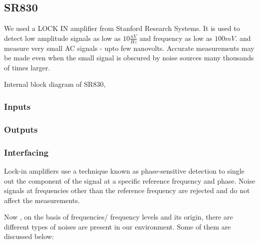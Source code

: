 \subsection{SR830}

We used a LOCK IN amplifier from Stanford Research Systems. It is used to detect low amplitude signals as low as $10\frac{nV}{Hz}$ and frequency as low as $100mV$.  and measure very small AC signals - upto few nanovolts. Accurate measurements may be made even when the small signal is obscured by noise sources many thousands of times larger.


Internal block diagram of SR830,


\subsubsection{Inputs}

\subsubsection{Outputs}

\subsubsection{Interfacing}



Lock-in amplifiers use a technique known as
phase-sensitive detection to single out the component of the signal at a specific reference frequency and phase. Noise signals at frequencies other than the reference frequency are rejected and do not affect the measurements.


Now , on the basis of frequencies/ frequency levels and its origin, there are different types of noises are present in our environment. Some of them are discussed below:

